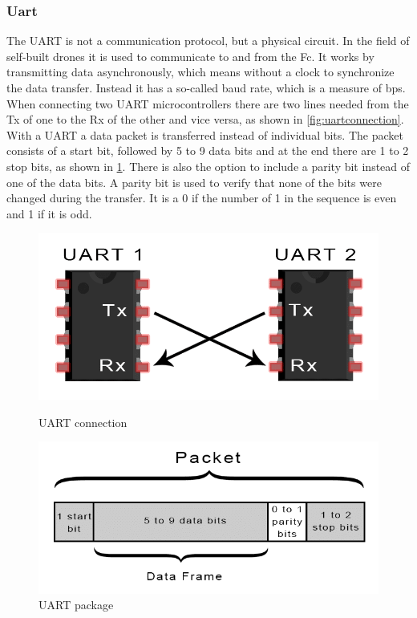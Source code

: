 \documentclass[svgnames]{article}
\begin{document}
	\subsubsection{Uart}
	The \gls{UART} is not a communication protocol, but a physical circuit. In the field of self-built drones it is used to communicate to and from the \gls{Fc}. It works by transmitting data asynchronously, which means without a clock to synchronize the data transfer. Instead it has a so-called baud rate, which is a measure of \gls{bps}. When connecting two \gls{UART} microcontrollers there are two lines needed from the Tx of one to the Rx of the other and vice versa, as shown in \cref{fig:uartconnection}. With a \gls{UART} a data packet is transferred instead of individual bits. The packet consists of a start bit, followed by 5 to 9 data bits and at the end there are 1 to 2 stop bits, as shown in \cref{fig:uartpackage}. There is also the option to include a parity bit instead of one of the data bits. A parity bit is used to verify that none of the bits were changed during the transfer. It is a 0 if the number of 1 in the sequence is even and 1 if it is odd.
	\cite{uartprotocol} %
\begin{figure}[ht]
	\begin{minipage}[c]{0.4\textwidth}
		\includegraphics[width=\textwidth]{pictures/UARTconnection}
		\caption{\gls{UART} connection \cite{uartprotocol}}
		\label{fig:uartconnection}
	\end{minipage}
	\hfill
	\begin{minipage}[c]{0.4\textwidth}
		\includegraphics[width=\textwidth]{pictures/Uartpackage}
		\caption{\gls{UART} package \cite{uartprotocol}}
		\label{fig:uartpackage}
	\end{minipage}
	
\end{figure}
\end{document}
